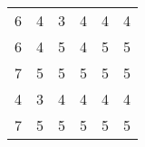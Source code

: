 \begin{table}[!t]
{\begin{tabular}{cccccc}
        6                                                                             & 4                                                                      & 3                                                                             & 4                                                                           & 4                                                                                                  & 4                                                                               \\
        6                                                                             & 4                                                                      & 5                                                                             & 4                                                                           & 5                                                                                                  & 5                                                                               \\
        7                                                                             & 5                                                                      & 5                                                                             & 5                                                                           & 5                                                                                                  & 5                                                                               \\
        4                                                                             & 3                                                                      & 4                                                                             & 4                                                                           & 4                                                                                                  & 4                                                                               \\
        7                                                                             & 5                                                                      & 5                                                                             & 5                                                                           & 5                                                                                                  & 5                                                                               \\ \hline

\end{tabular}}
\end{table}
